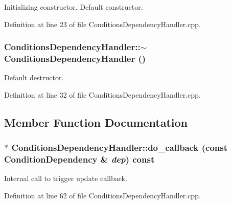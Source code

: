 Initializing constructor. Default constructor. 

Definition at line 23 of file ConditionsDependencyHandler.cpp.\hypertarget{class_d_d4hep_1_1_conditions_1_1_conditions_dependency_handler_ae67007fc5c43f4ad2092cca1c6247d78}{
\subsubsection[{$\sim$ConditionsDependencyHandler}]{\setlength{\rightskip}{0pt plus 5cm}ConditionsDependencyHandler::$\sim$ConditionsDependencyHandler ()}}
\label{class_d_d4hep_1_1_conditions_1_1_conditions_dependency_handler_ae67007fc5c43f4ad2092cca1c6247d78}


Default destructor. 

Definition at line 32 of file ConditionsDependencyHandler.cpp.

\subsection{Member Function Documentation}
\hypertarget{class_d_d4hep_1_1_conditions_1_1_conditions_dependency_handler_a9095116249b08e3a37ae0dfa4d94a140}{
\subsubsection[{do\_\-callback}]{ $\ast$ ConditionsDependencyHandler::do\_\-callback (const {\bf ConditionDependency} \& {\em dep}) const}}
\label{class_d_d4hep_1_1_conditions_1_1_conditions_dependency_handler_a9095116249b08e3a37ae0dfa4d94a140}


Internal call to trigger update callback. 

Definition at line 62 of file ConditionsDependencyHandler.cpp.

